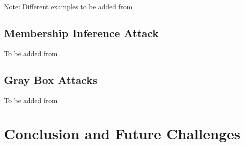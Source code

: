 \documentclass{article}
\newcommand{\ach}[1]{{\color{red}#1}}
\begin{document}
\ach{Note: Different examples to be added from \cite{rosenberg2017generic}}

\subsection{Membership Inference Attack}
\ach{To be added from \cite{shokri2017membership}}

\subsection{Gray Box Attacks}
\ach{To be added from \cite{moosavi2016deepfool}}

\section{Conclusion and Future Challenges}



\end{document}
